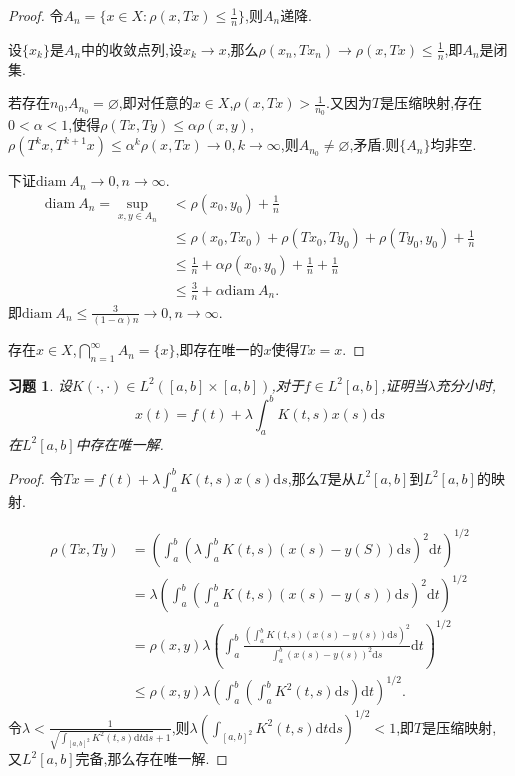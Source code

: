 \documentclass[a4paper,oneside,12pt]{ctexart}
\theoremstyle{plain}
\newtheorem{exercise}{习题}
\theoremstyle{nonumberplain}
\theoremstyle{nonumberplain}
\newtheorem{proof}{证明.}
\newcommand{\dif}{\mathrm{d}}
\renewcommand{\emptyset}{\varnothing}
\newcommand{\diam}{\mathrm{diam\ }}
\begin{document}
    \begin{proof}
        令$A_n=\{x\in X:\rho(x,Tx)\leqslant\frac{1}{n}\}$,则$A_n$递降.

        设$\{x_k\}$是$A_n$中的收敛点列,设$x_k\to x$,那么$\rho(x_n,Tx_n)\to\rho(x,Tx)\leqslant\frac{1}{n}$,即$A_n$是闭集.

        若存在$n_0$,$A_{n_0}=\emptyset$,即对任意的$x\in X$,$\rho(x,Tx)>\frac{1}{n_0}$.又因为$T$是压缩映射,存在$0<\alpha<1$,使得$\rho(Tx,Ty)\leqslant\alpha\rho(x,y)$,
        $\rho(T^kx,T^{k+1}x)\leqslant\alpha^k\rho(x,Tx)\to 0,k\to \infty$,则$A_{n_0}\neq\emptyset$,矛盾.则$\{A_n\}$均非空.

        下证$\diam A_n\to 0,n\to\infty$.
        \begin{align*}
            \diam A_n=\sup_{x,y\in A_n}&<\rho(x_0,y_0)+\frac{1}{n}\\
            &\leqslant \rho(x_0,Tx_0)+\rho(Tx_0,Ty_0)+\rho(Ty_0,y_0)+\frac{1}{n}\\
            &\leqslant \frac{1}{n}+\alpha\rho(x_0,y_0)+\frac{1}{n}+\frac{1}{n}\\
            &\leqslant \frac{3}{n}+\alpha\diam A_n.
        \end{align*}
        即$\diam A_n\leqslant\frac{3}{(1-\alpha)n}\to 0,n\to\infty$.

        存在$x\in X$,$\bigcap_{n=1}^\infty A_n=\{x\}$,即存在唯一的$x$使得$Tx=x$.
    \end{proof}
    
    \begin{exercise}
        \label{ex:3}
        设$K(\cdot,\cdot)\in L^2([a,b]\times [a,b])$,对于$f\in L^2[a,b]$,证明当$\lambda$充分小时,
        \begin{equation*}
            x(t)=f(t)+\lambda\int_a^bK(t,s)x(s)\dif s
        \end{equation*}
        在$L^2[a,b]$中存在唯一解.
    \end{exercise}

    \begin{proof}
        令$Tx=f(t)+\lambda\int_a^bK(t,s)x(s)\dif s$,那么$T$是从$L^2[a,b]$到$L^2[a,b]$的映射.

        \begin{align*}
            \rho(Tx,Ty)&=\left(\int_a^b\left(\lambda\int_a^bK(t,s)(x(s)-y(S))\dif s\right)^2\dif t\right)^{1/2}\\
            &=\lambda\left(\int_a^b\left(\int_a^bK(t,s)(x(s)-y(s))\dif s\right)^2\dif t\right)^{1/2}\\
            &=\rho(x,y)\lambda\left(\int_a^b \frac{\left(\int_a^b K(t,s)(x(s)-y(s))\dif s\right)^2}{\int_a^b(x(s)-y(s))^2\dif s}\dif t\right)^{1/2}\\
            &\leqslant \rho(x,y)\lambda\left(\int_a^b\left(\int_a^bK^2(t,s)\dif s\right)\dif t\right)^{1/2}.
        \end{align*}
        令$\lambda<\frac{1}{\sqrt{\int_{[a,b]^2}K^2(t,s)\dif t\dif s}+1}$,则$\lambda\left(\int_{[a,b]^2}K^2(t,s)\dif t\dif s\right)^{1/2}<1$,即$T$是压缩映射,
        又$L^2[a,b]$完备,那么存在唯一解.
    \end{proof}
\end{document}
